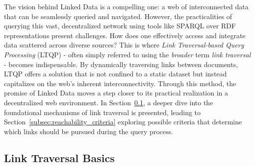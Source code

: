 The vision behind Linked Data is a compelling one: a web of interconnected data that can be seamlessly queried and navigated. However, the practicalities of querying this vast, decentralized network using tools like SPARQL over RDF representations present challenges. How does one effectively access and integrate data scattered across diverse sources? This is where \textit{Link Traversal-based Query Processing} (LTQP) - often simply referred to using the \textit{broader} term \textit{link traversal} - becomes indispensable. By dynamically traversing links between documents, LTQP offers a solution that is not confined to a static dataset but instead capitalizes on the web's inherent interconnectivity. Through this method, the promise of Linked Data moves a step closer to its practical realization in a decentralized web environment. In Section~\ref{subsec:lt_basics}, a deeper dive into the foundational mechanisms of link traversal is presented, leading to Section~\ref{subsec:reachability_criteria} exploring possible criteria that determine which links should be pursued during the query process. \citep{hartig2012foundations} \citep{taelman2023ltqp}

\subsection{Link Traversal Basics}
\label{subsec:lt_basics}

